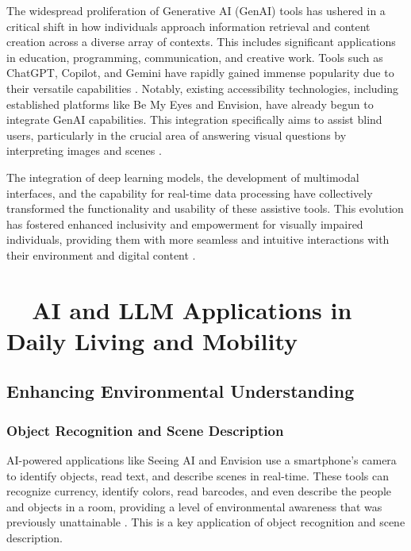 The widespread proliferation of Generative AI (GenAI) tools has ushered in a critical shift in how individuals approach information retrieval and content creation across a diverse array of contexts. This includes significant applications in education, programming, communication, and creative work. Tools such as ChatGPT, Copilot, and Gemini have rapidly gained immense popularity due to their versatile capabilities \supercite{maitraye2024}. Notably, existing accessibility technologies, including established platforms like Be My Eyes and Envision, have already begun to integrate GenAI capabilities. This integration specifically aims to assist blind users, particularly in the crucial area of answering visual questions by interpreting images and scenes \supercite{maitraye2024}.

The integration of deep learning models, the development of multimodal interfaces, and the capability for real-time data processing have collectively transformed the functionality and usability of these assistive tools. This evolution has fostered enhanced inclusivity and empowerment for visually impaired individuals, providing them with more seamless and intuitive interactions with their environment and digital content \supercite{arxiv2503}.

\section{~~AI and LLM Applications in Daily Living and Mobility}\label{ch9:sec:daily-living}

\subsection{Enhancing Environmental Understanding}\label{ch9:ssec:environmental-understanding}

\subsubsection{Object Recognition and Scene Description}\label{ch9:sssec:object-recognition}
AI-powered applications like Seeing AI and Envision use a smartphone's camera to identify objects, read text, and describe scenes in real-time. These tools can recognize currency, identify colors, read barcodes, and even describe the people and objects in a room, providing a level of environmental awareness that was previously unattainable \supercite{SeeingAI, msseeingai, envision}. This is a key application of object recognition and scene description.

